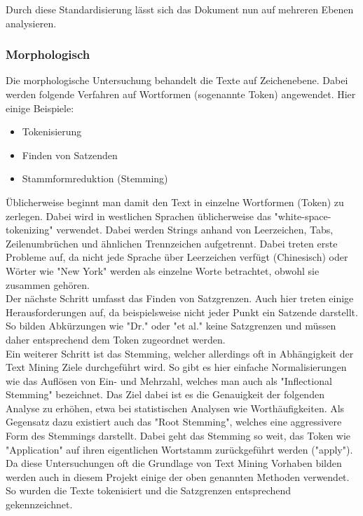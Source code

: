 Durch diese Standardisierung lässt sich das Dokument nun auf mehreren Ebenen analysieren.

\subsubsection{Morphologisch}
Die morphologische Untersuchung behandelt die Texte auf Zeichenebene. Dabei werden folgende Verfahren auf Wortformen (sogenannte Token) angewendet. Hier einige Beispiele:\\

\begin{itemize}
\item Tokenisierung
\item Finden von Satzenden
\item Stammformreduktion (Stemming)
\end{itemize}

Üblicherweise beginnt man damit den Text in einzelne Wortformen (Token) zu zerlegen. Dabei wird in westlichen Sprachen üblicherweise das "white-space-tokenizing" verwendet. Dabei werden Strings anhand von Leerzeichen, Tabs, Zeilenumbrüchen und ähnlichen Trennzeichen aufgetrennt. Dabei treten erste Probleme auf, da nicht jede Sprache über Leerzeichen verfügt (Chinesisch) oder Wörter wie "New York" werden als einzelne Worte betrachtet, obwohl sie zusammen gehören.\\

Der nächste Schritt umfasst das Finden von Satzgrenzen. Auch hier treten einige Herausforderungen auf, da beispielsweise nicht jeder Punkt ein Satzende darstellt. So bilden Abkürzungen wie "Dr." oder "et al." keine Satzgrenzen und müssen daher entsprechend dem Token zugeordnet werden.\\

Ein weiterer Schritt ist das Stemming, welcher allerdings oft in Abhängigkeit der Text Mining Ziele durchgeführt wird. So gibt es hier einfache Normalisierungen wie das Auflösen von Ein- und Mehrzahl, welches man auch als "Inflectional Stemming" bezeichnet. Das Ziel dabei ist es die Genauigkeit der folgenden Analyse zu erhöhen, etwa bei statistischen Analysen wie Worthäufigkeiten. Als Gegensatz dazu existiert auch das "Root Stemming", welches eine aggressivere Form des Stemmings darstellt. Dabei geht das Stemming so weit, das Token wie "Application" auf ihren eigentlichen Wortstamm zurückgeführt werden ("apply").\\

Da diese Untersuchungen oft die Grundlage von Text Mining Vorhaben bilden werden auch in diesem Projekt einige der oben genannten Methoden verwendet. So wurden die Texte tokenisiert und die Satzgrenzen entsprechend gekennzeichnet. \\

